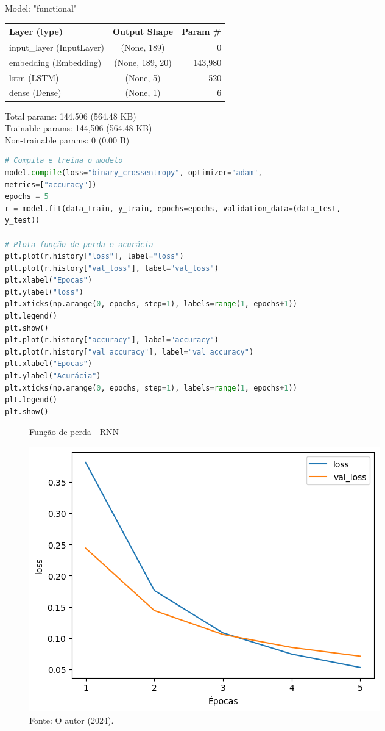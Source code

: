 \begin{tcolorbox}[myoutputstyle]
Model: "functional"
\begin{table}[H]
\begin{tabular}{|l|c|r|}
\hline
\textbf{Layer (type)} & \textbf{Output Shape} & \textbf{Param \#} \\ \hline
input\_layer (InputLayer) & (None, 189) & 0 \\ \hline
embedding (Embedding) & (None, 189, 20) & 143,980 \\ \hline
lstm (LSTM) & (None, 5) & 520 \\ \hline
dense (Dense) & (None, 1) & 6 \\ \hline
\end{tabular}
\end{table}
 Total params: 144,506 (564.48 KB)\\
 Trainable params: 144,506 (564.48 KB)\\
 Non-trainable params: 0 (0.00 B)
\end{tcolorbox}

\begin{lstlisting}[language=Python, style=input]
# Compila e treina o modelo
model.compile(loss="binary_crossentropy", optimizer="adam",
metrics=["accuracy"])
epochs = 5
r = model.fit(data_train, y_train, epochs=epochs, validation_data=(data_test,
y_test))

# Plota função de perda e acurácia
plt.plot(r.history["loss"], label="loss")
plt.plot(r.history["val_loss"], label="val_loss")
plt.xlabel("Epocas")
plt.ylabel("loss")
plt.xticks(np.arange(0, epochs, step=1), labels=range(1, epochs+1))
plt.legend()
plt.show()
plt.plot(r.history["accuracy"], label="accuracy")
plt.plot(r.history["val_accuracy"], label="val_accuracy")
plt.xlabel("Epocas")
plt.ylabel("Acurácia")
plt.xticks(np.arange(0, epochs, step=1), labels=range(1, epochs+1))
plt.legend()
plt.show()
\end{lstlisting}


\begin{figure}[H]
\centering
\caption{Função de perda - RNN}
\includegraphics[width=.8\linewidth]{apendices/fig/9_IAA009_5.png}
\caption*{Fonte: O autor (2024).}
\end{figure}

